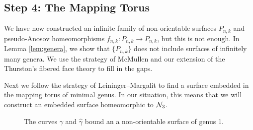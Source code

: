 \subsection*{Step 4: The Mapping Torus}

We have now constructed an infinite family of non-orientable surfaces $P_{n,k}$ and pseudo-Anosov homeomorphisms $f_{n,k}:P_{n,k}\to P_{n,k}$, but this is not
enough. In Lemma \ref{lem:genera}, we show that $\{P_{n,k}\}$ does not include surfaces of infinitely many genera. We use the strategy of McMullen \cite{mcmullen2000polynomial} and our extension of the Thurston's
fibered face theory to fill in the gaps.

Next we follow the strategy of Leininger--Margalit \cite{leininger2013number} to find a surface embedded in the mapping torus of minimal genus.  In our situation, this means that we will construct an embedded surface homeomorphic to $\mathcal{N}_3$.


\begin{figure}[t]
    \centering
    \caption{The curves $\gamma$ and $\widehat{\gamma}$ bound an a non-orientable surface of genus 1.}
    \label{fig:gammacurves}
\end{figure}

